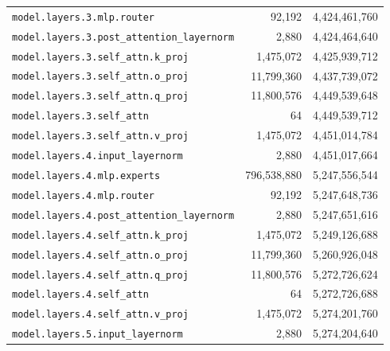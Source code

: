 \documentclass[10pt,a4paper]{article}
\theoremstyle{definition}
\begin{document}
\begin{appendices}
\begin{longtable}{p{9.5cm}rr}
\texttt{model.\allowbreak{}layers.\allowbreak{}3.\allowbreak{}mlp.\allowbreak{}router} & 92,192 & 4,424,461,760 \\
\texttt{model.\allowbreak{}layers.\allowbreak{}3.\allowbreak{}post\_attention\_layernorm} & 2,880 & 4,424,464,640 \\
\texttt{model.\allowbreak{}layers.\allowbreak{}3.\allowbreak{}self\_attn.\allowbreak{}k\_proj} & 1,475,072 & 4,425,939,712 \\
\texttt{model.\allowbreak{}layers.\allowbreak{}3.\allowbreak{}self\_attn.\allowbreak{}o\_proj} & 11,799,360 & 4,437,739,072 \\
\texttt{model.\allowbreak{}layers.\allowbreak{}3.\allowbreak{}self\_attn.\allowbreak{}q\_proj} & 11,800,576 & 4,449,539,648 \\
\texttt{model.\allowbreak{}layers.\allowbreak{}3.\allowbreak{}self\_attn} & 64 & 4,449,539,712 \\
\texttt{model.\allowbreak{}layers.\allowbreak{}3.\allowbreak{}self\_attn.\allowbreak{}v\_proj} & 1,475,072 & 4,451,014,784 \\
\texttt{model.\allowbreak{}layers.\allowbreak{}4.\allowbreak{}input\_layernorm} & 2,880 & 4,451,017,664 \\
\texttt{model.\allowbreak{}layers.\allowbreak{}4.\allowbreak{}mlp.\allowbreak{}experts} & 796,538,880 & 5,247,556,544 \\
\texttt{model.\allowbreak{}layers.\allowbreak{}4.\allowbreak{}mlp.\allowbreak{}router} & 92,192 & 5,247,648,736 \\
\texttt{model.\allowbreak{}layers.\allowbreak{}4.\allowbreak{}post\_attention\_layernorm} & 2,880 & 5,247,651,616 \\
\texttt{model.\allowbreak{}layers.\allowbreak{}4.\allowbreak{}self\_attn.\allowbreak{}k\_proj} & 1,475,072 & 5,249,126,688 \\
\texttt{model.\allowbreak{}layers.\allowbreak{}4.\allowbreak{}self\_attn.\allowbreak{}o\_proj} & 11,799,360 & 5,260,926,048 \\
\texttt{model.\allowbreak{}layers.\allowbreak{}4.\allowbreak{}self\_attn.\allowbreak{}q\_proj} & 11,800,576 & 5,272,726,624 \\
\texttt{model.\allowbreak{}layers.\allowbreak{}4.\allowbreak{}self\_attn} & 64 & 5,272,726,688 \\
\texttt{model.\allowbreak{}layers.\allowbreak{}4.\allowbreak{}self\_attn.\allowbreak{}v\_proj} & 1,475,072 & 5,274,201,760 \\
\texttt{model.\allowbreak{}layers.\allowbreak{}5.\allowbreak{}input\_layernorm} & 2,880 & 5,274,204,640 \\

\end{longtable}
\end{appendices}
\end{document}
